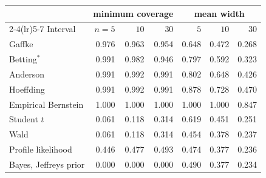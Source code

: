 \begin{tabular}{lrrrrrr}
\toprule
& \multicolumn{3}{c}{minimum coverage} & \multicolumn{3}{c}{mean width} \\
\cmidrule(lr){2-4}\cmidrule(lr){5-7}
Interval & $n = 5$ & $10$ & $30$ & $5$ & $10$ & $30$ \\
\midrule
Gaffke & 0.976 & 0.963 & 0.954 & 0.648 & 0.472 & 0.268 \\
Betting$^{*}$ & 0.991 & 0.982 & 0.946 & 0.797 & 0.592 & 0.323 \\
Anderson & 0.991 & 0.992 & 0.991 & 0.802 & 0.648 & 0.426 \\
Hoeffding & 0.991 & 0.992 & 0.991 & 0.878 & 0.728 & 0.470 \\
Empirical Bernstein & 1.000 & 1.000 & 1.000 & 1.000 & 1.000 & 0.847 \\
\midrule
Student $t$ & 0.061 & 0.118 & 0.314 & 0.619 & 0.451 & 0.251 \\
Wald & 0.061 & 0.118 & 0.314 & 0.454 & 0.378 & 0.237 \\
Profile likelihood & 0.446 & 0.477 & 0.493 & 0.474 & 0.377 & 0.236 \\
Bayes, Jeffreys prior & 0.000 & 0.000 & 0.000 & 0.490 & 0.377 & 0.234 \\
\bottomrule
\end{tabular}
